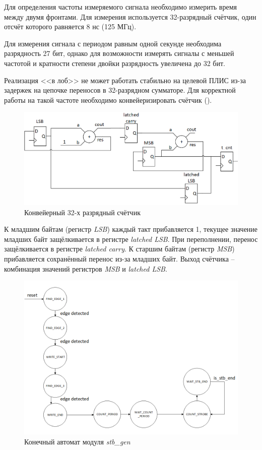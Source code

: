 Для определения частоты измеряемого сигнала необходимо измерить время между двумя фронтами.
Для измерения используется 32-разрядный счётчик, один отсчёт которого равняется 8 нс (125 МГц).

Для измерения сигнала с периодом равным одной секунде необходима разрядность 27 бит,
однако для возможности измерять сигналы с меньшей частотой 
и кратности степени двойки разрядность увеличена до 32 бит.

Реализация <<в лоб>> не может работать стабильно на целевой ПЛИС из-за задержек на цепочке переносов в 
32-разрядном сумматоре. Для корректной работы на такой частоте необходимо конвейеризировать счётчик ().

\begin{figure}[ht!] 
	\center
	\includegraphics [scale=0.7] {my_folder/images//t_cnt}
	\caption{Конвейерный 32-х разрядный счётчик} 
	\label{fig:t-cnt}  
\end{figure}

К младшим байтам (регистр \emph{LSB}) каждый такт прибавляется 1, текущее значение младших байт защёлкивается в регистре \emph{latched LSB}.
При переполнении, перенос защёлкивается в регистре \emph{latched carry}. К старшим байтам (регистр \emph{MSB}) прибавляется сохранённый перенос из-за
младших байт. Выход счётчика -- комбинация значений регистров \emph{MSB} и \emph{latched LSB}.


\lstset{
	numbersep = 5pt,
	stepnumber = 1
}


\begin{figure}[ht!] 
	\center
	\includegraphics [scale=0.7] {my_folder/images//stb_gen_fsm}
	\caption{Конечный автомат модуля \emph{stb\_gen}} 
	\label{fig:stb-gen-fsm}  
\end{figure}

